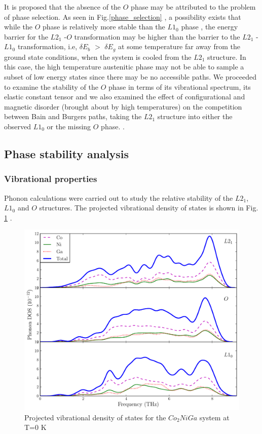 \documentclass[%
preprint,
 amsmath,amssymb,
 aps,
prb,
showkeys,
]{revtex4-1}
\begin{document}
It is proposed that the absence of the $O$ phase may be attributed to the problem of phase selection. As seen in  Fig.\ref{phase_selection} ,  a possibility exists that while the $O$ phase is relatively more stable than the $L1_0$ phase , the energy barrier for the $L2_1$ -$O$ transformation may be higher than the barrier to the $L2_1$ -$L1_0$ transformation, i.e, $\delta E_b$ $>$  $\delta E_g$ at some temperature far away from the ground state conditions, when the system is cooled from the $L2_1$ structure. In this case, the high temperature austenitic phase  may not be able to sample a subset of low energy states since there may be no accessible paths. We proceeded to examine the stability of the $O$ phase in terms of its vibrational spectrum, its elastic constant tensor and we also examined the effect of configurational and magnetic disorder (brought about by high temperatures) on the competition between Bain and Burgers paths, taking the $L2_1$ structure into either the observed $L1_0$ or the missing $O$ 
phase.
.
\subsection{Phase stability analysis}

\subsubsection{Vibrational properties}
Phonon calculations were carried out to study the relative stability of the $L2_1$, $L1_0$ and $O$ structures. The projected vibrational density of states is shown in Fig. \ref{CNG_pvdos} . 

\begin{figure}[htp!]
  \includegraphics[scale=0.7]{figure_6}
  \caption{Projected vibrational density of states for the $Co_2NiGa$ system at T=0 K }
  \label{CNG_pvdos}
\end{figure}
\end{document}
